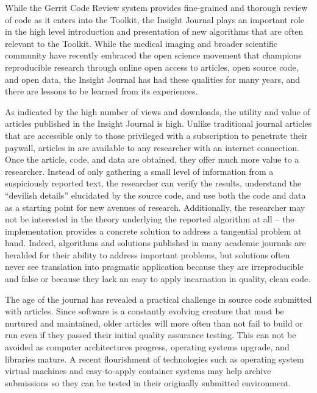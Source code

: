 \documentclass{frontiersENG} %
\begin{document}
While the Gerrit Code Review system provides fine-grained and thorough review
of code as it enters into the Toolkit, the Insight Journal plays an important
role in the high level introduction and presentation of new algorithms that
are often relevant to the Toolkit. While the medical imaging and broader
scientific community have recently embraced the open science movement that
champions reproducible research through online open access to articles, open
source code, and open data, the Insight Journal has had these qualities for
many years, and there are lessons to be learned from its experiences.

As indicated by the high number of views and downloads, the utility and value of
articles published in the Insight Journal is high.  Unlike traditional
journal articles that are accessible only to those privileged with a
subscription to penetrate their paywall, articles in are available to any
researcher with an internet connection. Once the article, code, and data are
obtained, they offer much more value to a researcher. Instead of only gathering a
small level of information from a suspiciously reported text, the researcher
can verify the results, understand the ``devilish details'' elucidated by the
source code, and use both the code and data as a starting point for new
avenues of research. Additionally, the researcher may not be interested in the
theory underlying the reported algorithm at all -- the implementation provides
a concrete solution to address a tangential problem at hand. Indeed,
algorithms and solutions published in many academic journals are heralded for
their ability to address important problems, but solutions often never see
translation into pragmatic application because they are irreproducible and
false or because they lack an easy to apply incarnation in quality, clean
code.

The age of the journal has revealed a practical challenge in source code
submitted with articles. Since software is a constantly evolving creature that
must be nurtured and maintained, older articles will more often than not fail
to build or run even if they passed their initial quality assurance testing.
This can not be avoided as computer architectures progress, operating systems
upgrade, and libraries mature. A recent flourishment of technologies such as
operating system virtual machines and easy-to-apply container systems may help
archive submissions so they can be tested in their originally submitted
environment.
\end{document}

